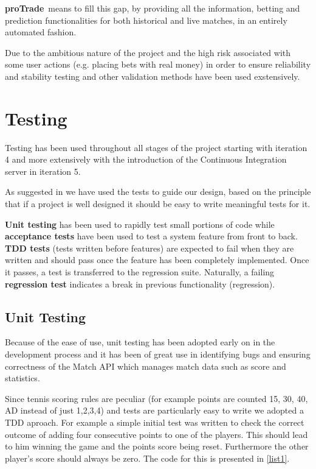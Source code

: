 \documentclass[10pt]{article}
\newcommand{\nm}{{\bf proTrade}}
\newcommand{\nmsp}{{\nm \ }}
\begin{document}
\nmsp means to fill this gap, by providing all the information, betting and prediction functionalities for both historical and live matches, in an entirely automated fashion.

Due to the ambitious nature of the project and the high risk associated with some user actions (e.g. placing bets with real money) in order to ensure reliability and stability testing and other validation methods have been used exstensively. 

\section{Testing}
Testing has been used throughout all stages of the project starting with iteration 4 and more extensively with the introduction of the Continuous Integration server in iteration 5.

As suggested in \cite{bk-testing} we have used the tests to guide our design, based on the principle that if a project is well designed it should be easy to write meaningful tests for it.

\textbf{Unit testing} has been used to rapidly test small portions of code while \textbf{acceptance tests} have been used to test a system feature from front to back. \textbf {TDD tests} (tests written before features) are expected to fail when they are written and should pass once the feature has been completely implemented. Once it passes, a test is transferred to the regression suite. Naturally, a failing \textbf{regression test} indicates a break in previous functionality (regression).


\subsection{Unit Testing}
Because of the ease of use, unit testing has been adopted early on in the development process and it has been of great use in identifying bugs and ensuring correctness of the Match API which manages match data such as score and statistics. 

Since tennis scoring rules are peculiar (for example points are counted 15, 30, 40, AD instead of just 1,2,3,4) and tests are particularly easy to write we adopted a TDD aproach. For example a simple initial test was written to check the correct outcome of adding four consecutive points to one of the players. This should lead to him winning the game and the points score being reset. Furthermore the other player's score should always be zero. The code for this is presented in \ref{list1}.
\end{document}
